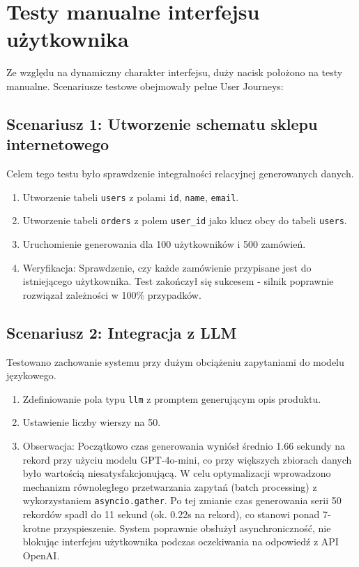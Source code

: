 \section{Testy manualne interfejsu użytkownika}
Ze względu na dynamiczny charakter interfejsu, duży nacisk położono na testy manualne. Scenariusze testowe obejmowały pełne User Journeys:

\subsection*{Scenariusz 1: Utworzenie schematu sklepu internetowego}
Celem tego testu było sprawdzenie integralności relacyjnej generowanych danych.
\begin{enumerate}
    \item Utworzenie tabeli \texttt{users} z polami \texttt{id}, \texttt{name}, \texttt{email}.
    \item Utworzenie tabeli \texttt{orders} z polem \texttt{user\_id} jako klucz obcy do tabeli \texttt{users}.
    \item Uruchomienie generowania dla 100 użytkowników i 500 zamówień.
    \item Weryfikacja: Sprawdzenie, czy każde zamówienie przypisane jest do istniejącego użytkownika. Test zakończył się sukcesem - silnik poprawnie rozwiązał zależności w 100\% przypadków.
\end{enumerate}

\subsection*{Scenariusz 2: Integracja z LLM}
Testowano zachowanie systemu przy dużym obciążeniu zapytaniami do modelu językowego.
\begin{enumerate}
    \item Zdefiniowanie pola typu \texttt{llm} z promptem generującym opis produktu.
    \item Ustawienie liczby wierszy na 50.
    \item Obserwacja: Początkowo czas generowania wyniósł średnio 1.66 sekundy na rekord przy użyciu modelu GPT-4o-mini, co przy większych zbiorach danych było wartością niesatysfakcjonującą. W celu optymalizacji wprowadzono mechanizm równoległego przetwarzania zapytań (batch processing) z wykorzystaniem \texttt{asyncio.gather}. Po tej zmianie czas generowania serii 50 rekordów spadł do 11 sekund (ok. 0.22s na rekord), co stanowi ponad 7-krotne przyspieszenie. System poprawnie obsłużył asynchroniczność, nie blokując interfejsu użytkownika podczas oczekiwania na odpowiedź z \gls{API} OpenAI.
\end{enumerate}

